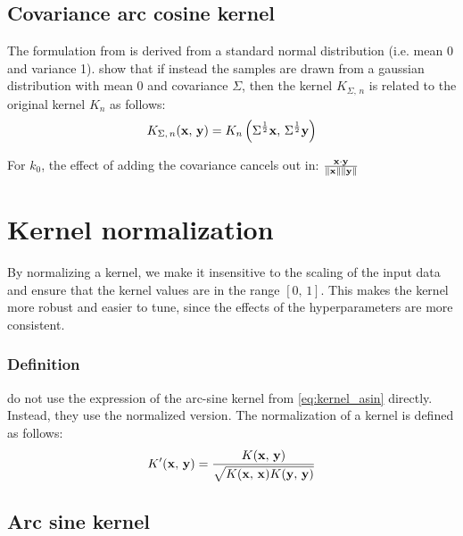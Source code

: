 \subsection{Covariance arc cosine kernel}%
\label{sub:covariance_acos}

The formulation from \textcite{choLargemarginClassificationInfinite2010} is
derived from a standard normal distribution (i.e. mean 0 and variance 1).
\Textcite{pandeyGoDeepWide2014} show that if instead the samples are drawn from
a gaussian distribution with mean 0 and covariance $\Sigma$, then the kernel
$K_{\Sigma,\,n}$ is related to the original kernel $K_{n}$ as follows:
\begin{equation}\label{eq:kernel_pandey}
    K_{\Sigma,\,n}(\mathbf{x},\,\mathbf{y}) = K_{n}\left(\Sigma^{\frac{1}{2}}\mathbf{x},\,\Sigma^{\frac{1}{2}}\mathbf{y}\right)
\end{equation}

\begin{cnote}
    For $k_0$, the effect of adding the covariance cancels out in:
    $\frac{\mathbf{x} \cdot \mathbf{y}}{\left\lVert \mathbf{x} \right\rVert \left\lVert \mathbf{y} \right\rVert}$
\end{cnote}

\section{Kernel normalization}%
\label{sec:kernel_normalization}

By normalizing a kernel, we make it insensitive to the scaling of the input
data and ensure that the kernel values are in the range $[0,\,1]$. This makes
the kernel more robust and easier to tune, since the effects of the
hyperparameters are more consistent.

\subsubsection{Definition}

\Textcite{frenayParameterinsensitiveKernelExtreme2011} do not use the expression
of the arc-sine kernel from \cref{eq:kernel_asin} directly. Instead, they use
the normalized version. The normalization of a kernel is defined as follows:
\begin{equation}\label{eq:kernel_normalization}
    K'(\mathbf{x},\,\mathbf{y}) = \frac{K(\mathbf{x},\,\mathbf{y})}{\sqrt{K(\mathbf{x},\,\mathbf{x})K(\mathbf{y},\,\mathbf{y})}}
\end{equation}

\subsection{Arc sine kernel}

